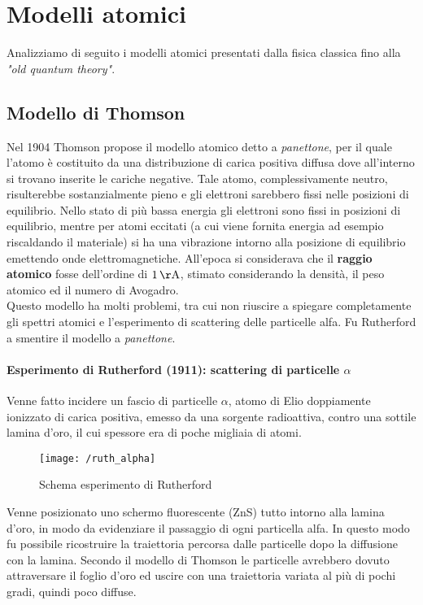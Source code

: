 

\section{Modelli atomici}
Analizziamo di seguito i modelli atomici presentati dalla fisica classica fino alla \textit{"old quantum theory"}.


\subsection{Modello di Thomson}
Nel 1904 Thomson propose il modello atomico detto a \textit{panettone}, per il quale l'atomo è costituito da una distribuzione di carica positiva diffusa dove all'interno si trovano inserite le cariche negative.
Tale atomo, complessivamente neutro, risulterebbe sostanzialmente pieno e gli elettroni sarebbero fissi nelle posizioni di equilibrio. 
Nello stato di più bassa energia gli elettroni sono fissi in posizioni di equilibrio, mentre per atomi eccitati (a cui viene fornita energia ad esempio riscaldando il materiale) si ha una vibrazione intorno alla posizione di equilibrio emettendo onde elettromagnetiche.
All'epoca si considerava che il \textbf{raggio atomico} fosse dell'ordine di $\SI{1}{\AA}$, stimato considerando la densità, il peso atomico ed il numero di Avogadro. \\
Questo modello ha molti problemi, tra cui non riuscire a spiegare completamente gli spettri atomici e l'esperimento di scattering delle particelle alfa.
Fu Rutherford a smentire il modello a \textit{panettone}.

\paragraph{Esperimento di Rutherford (1911): scattering di particelle $\alpha$}
Venne fatto incidere un fascio di particelle $\alpha$, atomo di Elio doppiamente ionizzato di carica positiva, emesso da una sorgente radioattiva, contro una sottile lamina d'oro, il cui spessore era di poche migliaia di atomi.
\begin{figure}[h]
\centering
\texttt{[image: /ruth\_alpha]}
\caption{Schema esperimento di Rutherford}
\end{figure}
Venne posizionato uno schermo fluorescente (ZnS) tutto intorno alla lamina d'oro, in modo da evidenziare il passaggio di ogni particella alfa.
In questo modo fu possibile ricostruire la traiettoria percorsa dalle particelle dopo la diffusione con la lamina.
Secondo il modello di Thomson le particelle avrebbero dovuto attraversare il foglio d'oro ed uscire con una traiettoria variata al più di pochi gradi, quindi poco diffuse.

